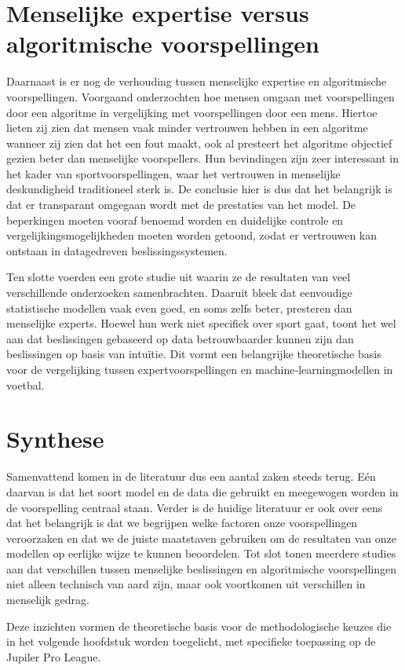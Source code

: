 \vspace{5pt}

\section{Menselijke expertise versus algoritmische voorspellingen}

Daarnaast is er nog de verhouding tussen menselijke expertise en algoritmische voorspellingen.
Voorgaand onderzochten \textcite{Dietvorst2015} hoe mensen omgaan met voorspellingen door een algoritme in vergelijking met voorspellingen door een mens.
Hiertoe lieten zij zien dat mensen vaak minder vertrouwen hebben in een algoritme wanneer zij zien dat het een fout maakt,
ook al presteert het algoritme objectief gezien beter dan menselijke voorspellers.
Hun bevindingen zijn zeer interessant in het kader van sportvoorspellingen, waar het vertrouwen in menselijke deskundigheid traditioneel sterk is.
De conclusie hier is dus dat het belangrijk is dat er transparant omgegaan wordt met de prestaties van het model. De beperkingen moeten vooraf benoemd worden en duidelijke 
controle en vergelijkingsmogelijkheden moeten worden getoond, zodat er vertrouwen kan ontstaan in datagedreven beslissingssystemen.

\vspace{5pt}

Ten slotte voerden \textcite{Grove2000} een grote studie uit waarin ze de resultaten van veel verschillende onderzoeken samenbrachten. 
Daaruit bleek dat eenvoudige statistische modellen vaak even goed, en soms zelfs beter, presteren dan menselijke experts. 
Hoewel hun werk niet specifiek over sport gaat, toont het wel aan dat beslissingen gebaseerd op data betrouwbaarder kunnen zijn dan beslissingen op basis van intuïtie. 
Dit vormt een belangrijke theoretische basis voor de vergelijking tussen expertvoorspellingen en machine‑learningmodellen in voetbal.

\vspace{5pt}

\section{Synthese}

Samenvattend komen in de literatuur dus een aantal zaken steeds terug. Eén daarvan is dat het soort model en de data die gebruikt 
en meegewogen worden in de voorspelling centraal staan.
Verder is de huidige literatuur er ook over eens dat het belangrijk is dat we
begrijpen welke factoren onze voorspellingen veroorzaken en dat we de juiste
maatstaven gebruiken om de resultaten van onze modellen op eerlijke wijze te kunnen beoordelen.
Tot slot tonen meerdere studies aan dat verschillen tussen menselijke beslissingen en algoritmische voorspellingen niet alleen technisch van aard zijn, 
maar ook voortkomen uit verschillen in menselijk gedrag.

\vspace{5pt}

Deze inzichten vormen de theoretische basis voor de methodologische keuzes 
die in het volgende hoofdstuk worden toegelicht, 
met specifieke toepassing op de Jupiler Pro League.